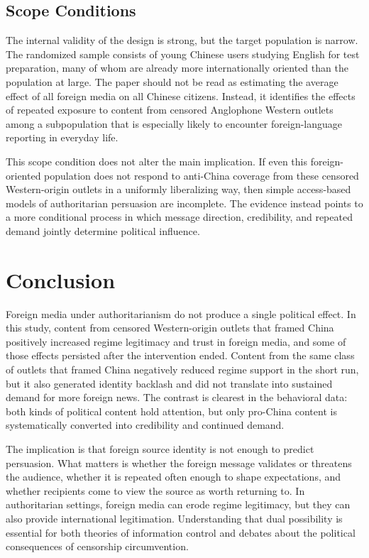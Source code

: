 \documentclass[12pt,american]{article}
\begin{document}
	\subsection*{Scope Conditions}
	
	The internal validity of the design is strong, but the target population is narrow. The randomized sample consists of young Chinese users studying English for test preparation, many of whom are already more internationally oriented than the population at large. The paper should not be read as estimating the average effect of all foreign media on all Chinese citizens. Instead, it identifies the effects of repeated exposure to content from censored Anglophone Western outlets among a subpopulation that is especially likely to encounter foreign-language reporting in everyday life.
	
	This scope condition does not alter the main implication. If even this foreign-oriented population does not respond to anti-China coverage from these censored Western-origin outlets in a uniformly liberalizing way, then simple access-based models of authoritarian persuasion are incomplete. The evidence instead points to a more conditional process in which message direction, credibility, and repeated demand jointly determine political influence.
	
	\section*{Conclusion}
	
	Foreign media under authoritarianism do not produce a single political effect. In this study, content from censored Western-origin outlets that framed China positively increased regime legitimacy and trust in foreign media, and some of those effects persisted after the intervention ended. Content from the same class of outlets that framed China negatively reduced regime support in the short run, but it also generated identity backlash and did not translate into sustained demand for more foreign news. The contrast is clearest in the behavioral data: both kinds of political content hold attention, but only pro-China content is systematically converted into credibility and continued demand.
	
	The implication is that foreign source identity is not enough to predict persuasion. What matters is whether the foreign message validates or threatens the audience, whether it is repeated often enough to shape expectations, and whether recipients come to view the source as worth returning to. In authoritarian settings, foreign media can erode regime legitimacy, but they can also provide international legitimation. Understanding that dual possibility is essential for both theories of information control and debates about the political consequences of censorship circumvention.
\end{document}
